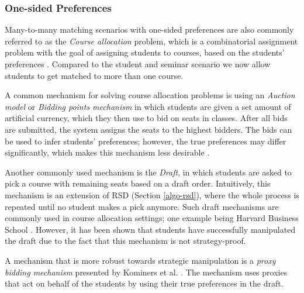 \subsubsection{One-sided Preferences}
Many-to-many matching scenarios with one-sided preferences are also commonly referred to as the \emph{Course allocation} problem, which is a combinatorial assignment problem with the goal of assigning students to courses, based on the students' preferences \cite{CourseAllocation}. Compared to the student and seminar scenario we now allow students to get matched to more than one course. 

A common mechanism for solving course allocation problems is using an \emph{Auction model} or \emph{Bidding points mechanism} in which students are given a set amount of artificial currency, which they then use to bid on seats in classes. After all bids are submitted, the system assigns the seats to the highest bidders. The bids can be used to infer students' preferences; however, the true preferences may differ significantly, which makes this mechanism less desirable \cite{Bidding}.

Another commonly used mechanism is the \emph{Draft}, in which students are asked to pick a course with remaining seats based on a draft order. Intuitively, this mechanism is an extension of RSD (Section \ref{algo-rsd}), where the whole process is repeated until no student makes a pick anymore. Such draft mechanisms are commonly used in course allocation settings; one example being Harvard Business School \cite{CourseAllocation}. However, it has been shown that students have successfully manipulated the draft due to the fact that this mechanism is not strategy-proof.

A mechanism that is more robust towards strategic manipulation is a \emph{proxy bidding mechanism} presented by Kominers et al. \cite{CourseAllocation}. The mechanism uses proxies that act on behalf of the students by using their true preferences in the draft.

